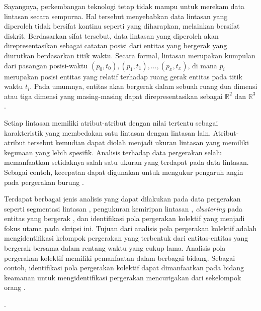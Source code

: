 Sayangnya, perkembangan teknologi tetap tidak mampu untuk merekam data lintasan secara sempurna. Hal tersebut menyebabkan data lintasan yang diperoleh tidak bersifat kontinu seperti yang diharapkan, melainkan bersifat diskrit. Berdasarkan sifat tersebut, data lintasan yang diperoleh akan direpresentasikan sebagai catatan posisi dari entitas yang bergerak yang diurutkan berdasarkan titik waktu. Secara formal, lintasan merupakan kumpulan dari pasangan posisi-waktu $(p_0, t_0), (p_1, t_1), \ldots, (p_x, t_x)$, di mana $p_i$ merupakan posisi entitas yang relatif terhadap ruang gerak entitas pada titik waktu $t_i$. Pada umumnya, entitas akan bergerak dalam sebuah ruang dua dimensi atau tiga dimensi yang masing-masing dapat direpresentasikan sebagai 
$\mathbb{R}^2$ dan $\mathbb{R}^3$. \iffalse \lionov{disebut di sini bahwa ruang gerak biasanya R2 atau R3}. \fi

Setiap lintasan memiliki atribut-atribut dengan nilai tertentu sebagai karakteristik yang membedakan satu lintasan dengan lintasan lain. Atribut-atribut tersebut kemudian dapat diolah menjadi ukuran lintasan yang memiliki kegunaan yang lebih spesifik. Analisis terhadap data pergerakan selalu memanfaatkan setidaknya salah satu ukuran yang terdapat pada data lintasan. Sebagai contoh, kecepatan dapat digunakan untuk mengukur pengaruh angin pada pergerakan burung \cite{safi:speed}.

\iffalse \lionov{jadiin paragraf baru, kan ini beda topik} \fi

Terdapat berbagai jenis analisis yang dapat dilakukan pada data pergerakan seperti segmentasi lintasan \cite{mann:01:segmentation}, pengukuran kemiripan lintasan \cite{rote:01:hausdorff, alt:01:frechet, muller:dtw}, \textit{clustering} pada entitas yang bergerak \cite{lee:01:clustering}, dan identifikasi pola pergerakan kolektif yang menjadi fokus utama pada skripsi ini. Tujuan dari analisis pola pergerakan kolektif adalah mengidentifikasi kelompok pergerakan yang terbentuk dari entitas-entitas yang bergerak bersama dalam rentang waktu yang cukup lama. Analisis pola pergerakan kolektif memiliki pemanfaatan dalam berbagai bidang. Sebagai contoh, identifikasi pola pergerakan kolektif dapat dimanfaatkan pada bidang keamanan untuk mengidentifikasi pergerakan mencurigakan dari sekelompok orang \cite{makris:01:security}.

\iffalse 

 .

